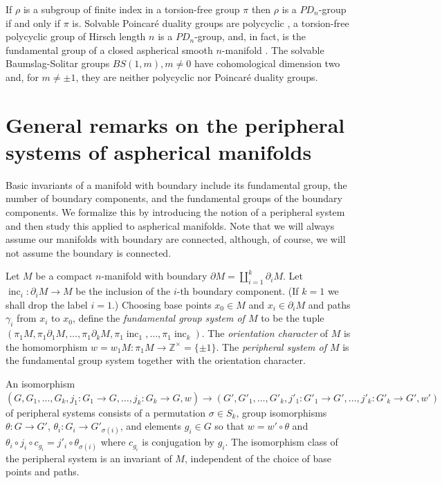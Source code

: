\documentclass[12pt]{amsart}
\theoremstyle{definition}
\newcommand{\Z}{\mathbb Z}
\DeclareMathOperator{\inc}{inc}
\begin{document}
If $\rho$ is a subgroup of finite index in a torsion-free group $\pi$
then $\rho$ is a $PD_n$-group if and only if $\pi$ is.  
Solvable Poincar\'e duality groups are polycyclic \cite{Bieri}, a torsion-free polycyclic group of Hirsch length $n$ is a $PD_n$-group, and, in fact, is the fundamental group of a closed aspherical smooth $n$-manifold \cite{AJ}.
The solvable Baumslag-Solitar groups $BS(1,m), m \not = 0$ have cohomological dimension two and,  
for $m \not = \pm 1$,
they are neither polycyclic nor Poincar\'e duality groups.  

\section{General remarks on the peripheral systems of aspherical manifolds}

Basic invariants of a manifold with boundary include its fundamental group, 
the number of boundary components, 
and the fundamental groups of the boundary components.     
We formalize this by introducing the notion of a peripheral system and 
then study this applied to aspherical manifolds.
Note that we will always assume our manifolds with boundary are connected, 
although, of course, we will not assume the boundary is connected.

Let $M$ be a compact $n$-manifold with boundary
$\partial{M}=\coprod_{i=1}^k\partial_i{M}$.  
Let $\inc_i : \partial_i{M} \to M$ be the inclusion of the $i$-th boundary component.   
(If $k=1$ we shall drop the label $i=1$.) 
Choosing base points $x_0 \in M$ and $x_i \in \partial_iM$ and paths $\gamma_i$ from $x_i$ to $x_0$, define the {\em fundamental group system of $M$} to be the tuple 
$(\pi_1M , \pi_1 \partial_1M, \dots, \pi_1 \partial_kM, \pi_1\inc_1, \dots , \pi_1\inc_k)$.   
The {\em orientation character} of $M$ is the homomorphism 
$w =w_1M  : \pi_1M \to \Z^{\times}= \{\pm 1\}$.  
The {\em peripheral system of $M$} is the fundamental group system together with the orientation character.

An isomorphism $(G, G_1, \dots, G_k, j_1: G_1 \to G, \dots, j_k : G_k \to G, w) \to (G', G'_1, \dots, G'_k, j'_1: G'_1 \to G', \dots, j'_k : G'_k \to G',w') $ of peripheral systems consists of a permutation $\sigma \in S_k$, group isomorphisms $\theta : G \to G'$, $\theta_i : G_i \to G'_{\sigma(i)}$, and elements $g_i \in G$ so that $w= w' \circ \theta$ and $\theta_i \circ j_i \circ c_{g_i} = j'_i \circ \theta_{\sigma(i)}$ where $c_{g_i}$ is conjugation by $g_i$.   The isomorphism class of the peripheral system is an invariant of $M$, independent of the choice of base points and paths.
\end{document}
